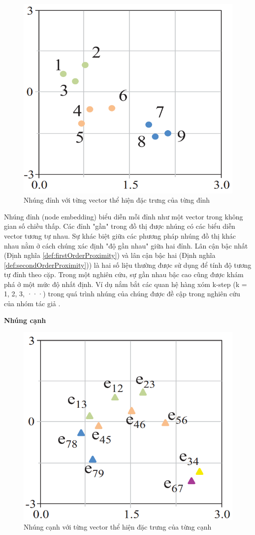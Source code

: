 \begin{figure}[htp]
	\centering
	\includegraphics[width=7 cm]{images/graph_emb_2.png}
	\caption{
		Nhúng đỉnh với từng vector thể hiện đặc trưng của từng đỉnh}
	\label{fig:nodeEmbedding}
\end{figure}

Nhúng đỉnh (node embedding) biểu diễn mỗi đỉnh như một vector trong không gian số chiều thấp. Các đỉnh "gần" trong đồ thị được nhúng có các biểu diễn vector tương tự nhau. Sự khác biệt giữa các phương pháp nhúng đồ thị khác nhau nằm ở cách chúng xác định "độ gần nhau" giữa hai đỉnh. Lân cận bậc nhất (Định nghĩa \ref{def:firstOrderProximity}) và lân cận bậc hai (Định nghĩa \ref{def:secondOrderProximity})) là hai số liệu thường được sử dụng để tính độ tương tự đỉnh theo cặp. Trong một nghiên cứu, sự gần nhau bậc cao cũng được khám phá ở một mức độ nhất định. Ví dụ nắm bắt các quan hệ hàng xóm k-step (k = 1, 2, 3, ···) trong quá trình nhúng của chúng được đề cập trong nghiên cứu của nhóm tác giả \cite{cao2015grarep}.

\textbf{Nhúng cạnh}
\label{sec:edgeEmbedding}

\begin{figure}[htp]
	\centering
	\includegraphics[width=7 cm]{images/graph_emb_3.png}
	\caption{Nhúng cạnh với từng vector thể hiện đặc trưng của từng cạnh}
	\label{fig:edgeEmbedding}
\end{figure}

